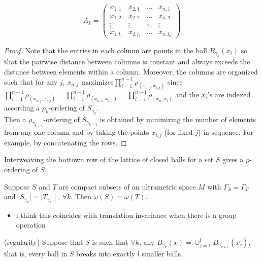 \[A_k=
 \begin{pmatrix}
  x_{1,1} & x_{2,1} & \ldots  &x_{n,1} \\
  x_{1,2} & x_{2,2} &\ldots &x_{n,2} \\
  \vdots & \vdots & \ddots & \vdots \\
  x_{1,l_1} & x_{2,l_2} & \ldots &x_{n,l_n}
 \end{pmatrix}
\]


\begin{proof}
Note that the entries in each column are points in the ball $B_{\gamma_k}(x_i)$ so that the pairwise distance between columns is constant and always exceeds the distance between elements within a column. Moreover, the columns are organized such that for any $j$, $x_{n,j}$ maximizes$\prod_{i=1}^{n-1} \rho_(x_{n,j},x_{i,j})$ since $\prod_{i=1}^{n-1} \rho_(x_{n,j},x_{i,j}) = \prod_{i=1}^{n-1} \rho_(x_{n,1},x_{i,1}) = \prod_{i=1}^{n-1} \rho_(x_{n},x_{i})$ and the $x_i$'s are indexed according a $\rho_k$-ordering of $S_{\gamma_k}$.\\

Then a $\rho_{\gamma_{k+1}}$-ordering of $S_{\gamma_{k+1}}$ is obtained by minimizing the number of elements from any one column and by taking the points $x_{i,j}$ (for fixed $j$) in sequence. For example, by concatenating the rows.
\end{proof}

\begin{corollary*}
Interweaving the bottown row of the lattice of closed balls for a set $S$ gives a $\rho$-ordering of $S$. 
\end{corollary*}

\begin{corollary*}
Suppose $S$ and $T$ are compact subsets of an ultrametric space $M$ with $\Gamma_S = \Gamma_T$ and $\mid S_{\gamma_k}\mid =\mid T_{\gamma_k}\mid$, $\forall k$. Then $\omega(S) = \omega(T)$. 
\end{corollary*}
\begin{itemize}
\item i think this coincides with translation invariance when there is a group operation
\end{itemize}

\begin{corollary*}
(regularity) Suppose that $S$ is such that $\forall k$, any $B_{\gamma_k}(x)=\cup_{j=1}^l B_{\gamma_{k+1}}(x_j)$, that is, every ball in $S$ breaks into exactly $l$ smaller balls. 
\end{corollary*}
